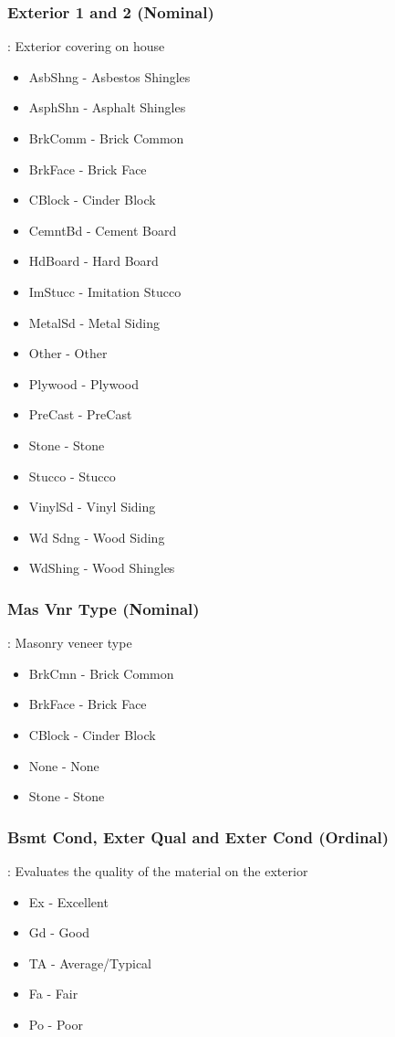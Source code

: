 \documentclass[sigconf]{acmart}
\begin{document}
	\subsubsection{Exterior 1 and 2 (Nominal)}: Exterior covering on house
	\begin{itemize}
		\item  AsbShng - Asbestos Shingles
		\item  AsphShn - Asphalt Shingles
		\item  BrkComm - Brick Common
		\item  BrkFace - Brick Face
		\item  CBlock -  Cinder Block
		\item  CemntBd - Cement Board
		\item  HdBoard - Hard Board
		\item  ImStucc - Imitation Stucco
		\item  MetalSd - Metal Siding
		\item  Other - Other
		\item  Plywood - Plywood
		\item  PreCast - PreCast
		\item  Stone - Stone
		\item  Stucco - Stucco
		\item  VinylSd - Vinyl Siding
		\item  Wd Sdng - Wood Siding
		\item  WdShing - Wood Shingles
	\end{itemize}
	
	\subsubsection{Mas Vnr Type (Nominal)}: Masonry veneer type
	\begin{itemize}
		\item  BrkCmn - Brick Common
		\item  BrkFace - Brick Face
		\item  CBlock - Cinder Block
		\item  None - None
		\item  Stone - Stone
	\end{itemize}
	
	\subsubsection{Bsmt Cond, Exter Qual and Exter Cond (Ordinal)}: Evaluates the quality of the material on the exterior
	\begin{itemize}
		\item  Ex - Excellent
		\item  Gd - Good
		\item  TA - Average/Typical
		\item  Fa - Fair
		\item  Po - Poor
	\end{itemize}
	
\end{document}
